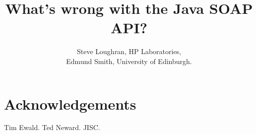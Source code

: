 \documentclass[draft]{article}
\begin{document}




\title{What's wrong with the Java SOAP API?}
\author{
    Steve Loughran, HP Laboratories,\\
    Edmund Smith, University of Edinburgh. 
    }
\maketitle








\section{Acknowledgements}

Tim Ewald. Ted Neward. JISC.




\onecolumn

%


\end{document}
